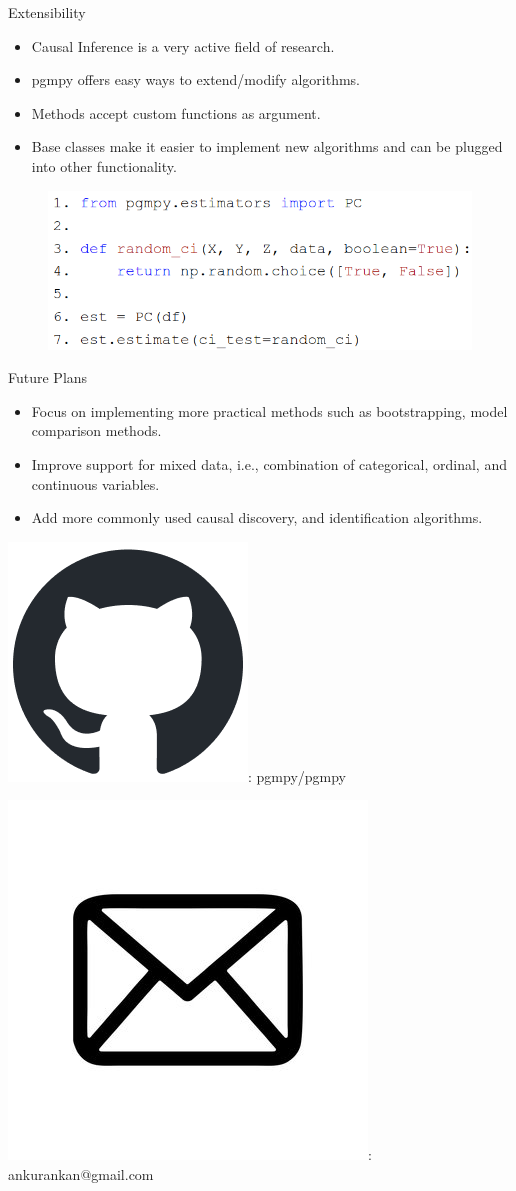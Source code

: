 \documentclass{beamer}
\newcommand\github{\includegraphics[height=2ex]{imgs/github.png}}
\newcommand\email{\includegraphics[height=3ex]{imgs/email.png}}
\begin{document}
\begin{frame}{Extensibility}
	\begin{itemize}
		\item Causal Inference is a very active field of research.
		\item pgmpy offers easy ways to extend/modify algorithms.
		\item Methods accept custom functions as argument.
		\item Base classes make it easier to implement new algorithms and can be plugged into other functionality.
	\end{itemize}
	\vspace{1em}
	\begin{figure}
		\centering
		\includegraphics[scale=0.3]{imgs/extend.png}
	\end{figure}
\end{frame}

\begin{frame}{Future Plans}
	\begin{itemize}
		\item Focus on implementing more practical methods such as bootstrapping, model comparison methods.
		\item Improve support for mixed data, i.e., combination of categorical, ordinal, and continuous variables.
		\item Add more commonly used causal discovery, and identification algorithms.
	\end{itemize}
\end{frame}

\begin{frame}
	\vspace{5em}

	\github : pgmpy/pgmpy
	\vspace{1em}

	\email : ankurankan@gmail.com
\end{frame}

% 
\end{document}
